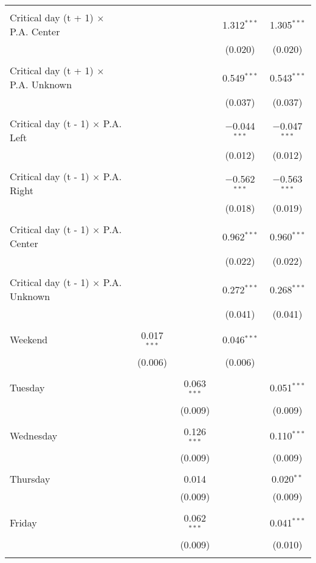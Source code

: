 \documentclass[
]{article}
\begin{document}
\begin{table}[!htbp]
{\begin{tabular}{@{\extracolsep{5pt}}lcccc}
  & & & & \\ 
 Critical day (t + 1) $\times$ P.A. Center &  &  & 1.312$^{***}$ & 1.305$^{***}$ \\ 
  &  &  & (0.020) & (0.020) \\ 
  & & & & \\ 
 Critical day (t + 1) $\times$ P.A. Unknown &  &  & 0.549$^{***}$ & 0.543$^{***}$ \\ 
  &  &  & (0.037) & (0.037) \\ 
  & & & & \\ 
 Critical day (t - 1) $\times$ P.A. Left &  &  & $-$0.044$^{***}$ & $-$0.047$^{***}$ \\ 
  &  &  & (0.012) & (0.012) \\ 
  & & & & \\ 
 Critical day (t - 1) $\times$ P.A. Right &  &  & $-$0.562$^{***}$ & $-$0.563$^{***}$ \\ 
  &  &  & (0.018) & (0.019) \\ 
  & & & & \\ 
 Critical day (t - 1) $\times$ P.A. Center &  &  & 0.962$^{***}$ & 0.960$^{***}$ \\ 
  &  &  & (0.022) & (0.022) \\ 
  & & & & \\ 
 Critical day (t - 1) $\times$ P.A. Unknown &  &  & 0.272$^{***}$ & 0.268$^{***}$ \\ 
  &  &  & (0.041) & (0.041) \\ 
  & & & & \\ 
 Weekend & 0.017$^{***}$ &  & 0.046$^{***}$ &  \\ 
  & (0.006) &  & (0.006) &  \\ 
  & & & & \\ 
 Tuesday &  & 0.063$^{***}$ &  & 0.051$^{***}$ \\ 
  &  & (0.009) &  & (0.009) \\ 
  & & & & \\ 
 Wednesday &  & 0.126$^{***}$ &  & 0.110$^{***}$ \\ 
  &  & (0.009) &  & (0.009) \\ 
  & & & & \\ 
 Thursday &  & 0.014 &  & 0.020$^{**}$ \\ 
  &  & (0.009) &  & (0.009) \\ 
  & & & & \\ 
 Friday &  & 0.062$^{***}$ &  & 0.041$^{***}$ \\ 
  &  & (0.009) &  & (0.010) \\ 
  & & & & \\ 

\end{tabular}}
\end{table}
\end{document}
